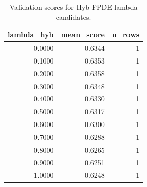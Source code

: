 \begin{table}[t]
\caption{Validation scores for Hyb-FPDE lambda candidates.}
\label{tab:lambda_distribution_computed}
\centering
\begin{tabular}{rrr}
\toprule
lambda\_hyb & mean\_score & n\_rows \\
\midrule
0.0000 & 0.6344 & 1 \\
0.1000 & 0.6353 & 1 \\
0.2000 & 0.6358 & 1 \\
0.3000 & 0.6348 & 1 \\
0.4000 & 0.6330 & 1 \\
0.5000 & 0.6317 & 1 \\
0.6000 & 0.6300 & 1 \\
0.7000 & 0.6288 & 1 \\
0.8000 & 0.6265 & 1 \\
0.9000 & 0.6251 & 1 \\
1.0000 & 0.6248 & 1 \\
\bottomrule
\end{tabular}

\end{table}
